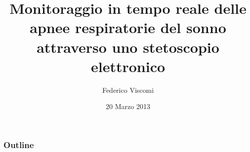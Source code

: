 \documentclass{beamer}
\title{Monitoraggio in tempo reale delle apnee respiratorie del sonno
attraverso uno stetoscopio elettronico}
\author{Federico Viscomi}
\date{20 Marzo 2013}
\begin{document}
\begin{frame}
\titlepage
\end{frame}


\begin{frame}
\frametitle{Outline}
\tableofcontents
\end{frame}















\end{document}
